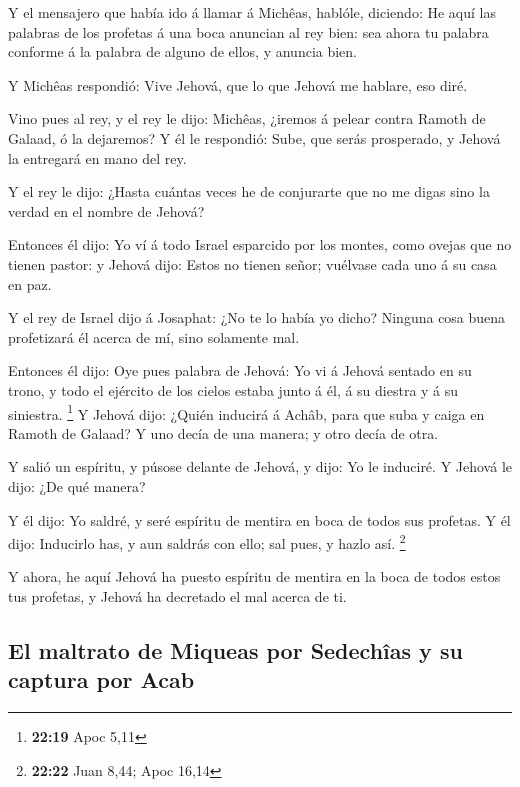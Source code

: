  Y el mensajero que había ido á llamar á Michêas,
hablóle, diciendo: He aquí las palabras de los profetas á una boca
anuncian al rey bien: sea ahora tu palabra conforme á la palabra de
alguno de ellos, y anuncia bien.

 Y Michêas respondió: Vive Jehová, que lo que Jehová me
hablare, eso diré.

 Vino pues al rey, y el rey le dijo: Michêas, ¿iremos á
pelear contra Ramoth de Galaad, ó la dejaremos? Y él le respondió: Sube,
que serás prosperado, y Jehová la entregará en mano del rey.

 Y el rey le dijo: ¿Hasta cuántas veces he de conjurarte
que no me digas sino la verdad en el nombre de Jehová?

 Entonces él dijo: Yo ví á todo Israel esparcido por los
montes, como ovejas que no tienen pastor: y Jehová dijo: Estos no tienen
señor; vuélvase cada uno á su casa en paz.

 Y el rey de Israel dijo á Josaphat: ¿No te lo había yo
dicho? Ninguna cosa buena profetizará él acerca de mí, sino solamente
mal.

 Entonces él dijo: Oye pues palabra de Jehová: Yo vi á
Jehová sentado en su trono, y todo el ejército de los cielos estaba
junto á él, á su diestra y á su siniestra. \footnote{\textbf{22:19} Apoc
  5,11}  Y Jehová dijo: ¿Quién inducirá á Achâb, para que
suba y caiga en Ramoth de Galaad? Y uno decía de una manera; y otro
decía de otra.

 Y salió un espíritu, y púsose delante de Jehová, y dijo:
Yo le induciré. Y Jehová le dijo: ¿De qué manera?

 Y él dijo: Yo saldré, y seré espíritu de mentira en boca
de todos sus profetas. Y él dijo: Inducirlo has, y aun saldrás con ello;
sal pues, y hazlo así. \footnote{\textbf{22:22} Juan 8,44; Apoc 16,14}

 Y ahora, he aquí Jehová ha puesto espíritu de mentira en
la boca de todos estos tus profetas, y Jehová ha decretado el mal acerca
de ti.

\hypertarget{el-maltrato-de-miqueas-por-sedechuxeeas-y-su-captura-por-acab}{%
\subsection{El maltrato de Miqueas por Sedechîas y su captura por
Acab}\label{el-maltrato-de-miqueas-por-sedechuxeeas-y-su-captura-por-acab}}

